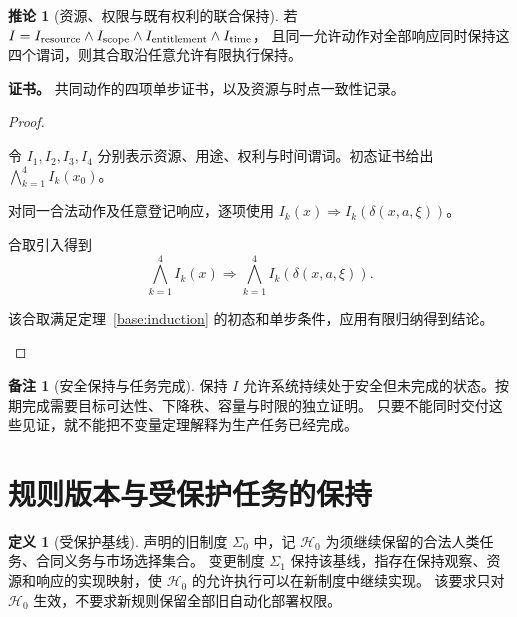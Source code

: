 \documentclass[UTF8,12pt,a4paper,openany,fontset=none,zihao=false]{ctexrep}
\theoremstyle{definition}
\newtheorem{definition}{定义}[chapter]
\newtheorem{corollary}{推论}[chapter]
\newtheorem{remark}{备注}[chapter]
\newenvironment{certificate}{\par\noindent\textbf{证书。}\ignorespaces}{\par}
\newcommand{\1}{\mathbf 1}
\begin{document}
\begin{corollary}[资源、权限与既有权利的联合保持]
若 \(I=I_{\rm resource}\land I_{\rm scope}\land I_{\rm entitlement}\land I_{\rm time}\)，
且同一允许动作对全部响应同时保持这四个谓词，则其合取沿任意允许有限执行保持。
\end{corollary}
\begin{certificate}
共同动作的四项单步证书，以及资源与时点一致性记录。
\end{certificate}
\begin{proof}
\begin{semanticsteps}
\item 令 \(I_1,I_2,I_3,I_4\) 分别表示资源、用途、权利与时间谓词。初态证书给出 \(\bigwedge_{k=1}^4I_k(x_0)\)。
\item 对同一合法动作及任意登记响应，逐项使用
\(I_k(x)\Rightarrow I_k(\delta(x,a,\xi))\)。
\item 合取引入得到
\[
\bigwedge_{k=1}^4I_k(x)
\Longrightarrow\bigwedge_{k=1}^4I_k(\delta(x,a,\xi)).
\]
\item 该合取满足定理~\ref{base:induction} 的初态和单步条件，应用有限归纳得到结论。
\end{semanticsteps}
\end{proof}

\begin{remark}[安全保持与任务完成]
保持 \(I\) 允许系统持续处于安全但未完成的状态。按期完成需要目标可达性、下降秩、容量与时限的独立证明。
只要不能同时交付这些见证，就不能把不变量定理解释为生产任务已经完成。
\end{remark}

\section{规则版本与受保护任务的保持}

\begin{definition}[受保护基线]
声明的旧制度 \(\Sigma_0\) 中，记 \(\mathcal H_0\) 为须继续保留的合法人类任务、合同义务与市场选择集合。
变更制度 \(\Sigma_1\) 保持该基线，指存在保持观察、资源和响应的实现映射，使 \(\mathcal H_0\) 的允许执行可以在新制度中继续实现。
该要求只对 \(\mathcal H_0\) 生效，不要求新规则保留全部旧自动化部署权限。
\end{definition}
\end{document}
